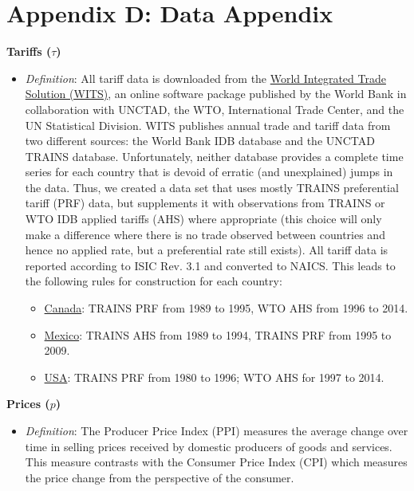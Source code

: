\section{Appendix D: Data Appendix}
\begin{spacing}{1}

\noindent \textbf{Tariffs ($\tau$)}
	\begin{itemize}
	
	\item \emph{Definition}: All tariff data is downloaded from the \href{http://wits.worldbank.org/Default.aspx}{World Integrated Trade Solution (WITS)}, an online software package published by the World Bank in collaboration with UNCTAD, the WTO, International Trade Center, and the UN Statistical Division. WITS publishes annual trade and tariff data from two different sources: the World Bank IDB database and the UNCTAD TRAINS database. Unfortunately, neither database provides a complete time series for each country that is devoid of erratic (and unexplained) jumps in the data. Thus, we created a data set that uses mostly TRAINS preferential tariff (PRF) data, but supplements it with observations from TRAINS or WTO IDB applied tariffs (AHS) where appropriate (this choice will only make a difference where there is no trade observed between countries and hence no applied rate, but a preferential rate still exists). All tariff data is reported according to ISIC Rev. 3.1 and converted to NAICS. This leads to the following rules for construction for each country:
		\begin{itemize}
		\item \underline{Canada}: TRAINS PRF from 1989 to 1995, WTO AHS from 1996 to 2014.

		\item \underline{Mexico}: TRAINS AHS from 1989 to 1994, TRAINS PRF from 1995 to 2009.

		\item \underline{USA}: TRAINS PRF from 1980 to 1996; WTO AHS for 1997 to 2014.
		\end{itemize}
	\end{itemize}


\noindent \textbf{Prices ($p$)}
	\begin{itemize}
	
	\item \emph{Definition}: The Producer Price Index (PPI) measures the average change over time in selling prices received by domestic producers of goods and services. This measure contrasts with the Consumer Price Index (CPI) which measures the price change from the perspective of the consumer. 
	

\end{itemize}
\end{spacing}

